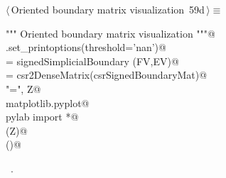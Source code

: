 \documentclass[11pt,oneside]{article}    %
\begin{document}
\begin{flushleft} \small \label{scrap111}
\protect{}$\langle\,$Oriented boundary matrix visualization\nobreak\ {\footnotesize 59d}$\,\rangle\equiv$
\vspace{-1ex}
\begin{list}{}{} \item
\mbox{}\verb@""" Oriented boundary matrix visualization """@\\
\mbox{}\verb@np.set_printoptions(threshold='nan')@\\
\mbox{}\verb@csrSignedBoundaryMat = signedSimplicialBoundary (FV,EV)@\\
\mbox{}\verb@Z = csr2DenseMatrix(csrSignedBoundaryMat)@\\
\mbox{}\verb@print "\ncsrSignedBoundaryMat =\n", Z@\\
\mbox{}\verb@import matplotlib.pyplot@\\
\mbox{}\verb@from pylab import *@\\
\mbox{}\verb@matshow(Z)@\\
\mbox{}\verb@show()@\\
\mbox{}\verb@@{\NWsep}
\end{list}
\vspace{-1ex}
\footnotesize\addtolength{\baselineskip}{-1ex}
\begin{list}{}{\setlength{\itemsep}{-\parsep}\setlength{\itemindent}{-\leftmargin}}
\item \NWtxtMacroRefIn\ .
\end{list}
\end{flushleft}
\end{document}
